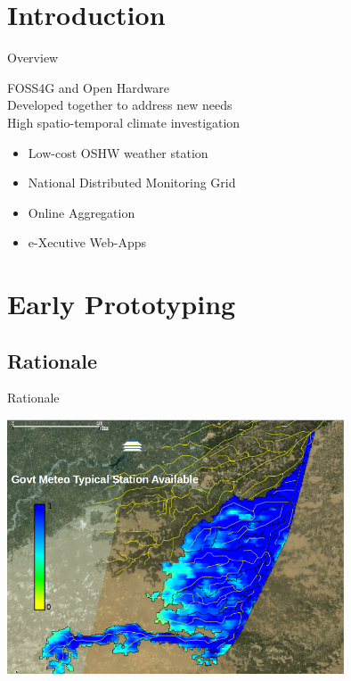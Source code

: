 \documentclass[xcolor=dvipsnames,beamer]{beamer} %
\begin{document}
\section{Introduction}
\begin{frame}[fragile]{Overview}

FOSS4G and Open Hardware\\
Developed together to address new needs\\
High spatio-temporal climate investigation
\newline\linebreak

\begin{itemize}
 \item Low-cost OSHW weather station
 \item National Distributed Monitoring Grid
 \item Online Aggregation
 \item e-Xecutive Web-Apps
\end{itemize}
\end{frame}

\section{Early Prototyping}
\subsection{Rationale}
\begin{frame}[fragile]{Rationale}

\begin{center}
  \includegraphics[width=10cm]{MWS_v1_deltaT_rationale_0}
\end{center}

\end{frame}
\end{document}
